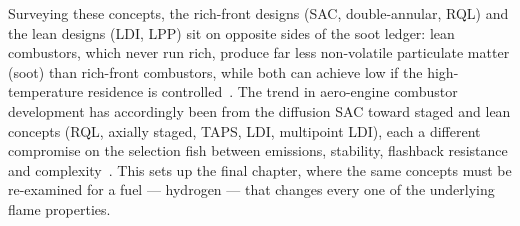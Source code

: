 Surveying these concepts, the rich-front designs (SAC, double-annular, RQL) and the lean designs (LDI, LPP) sit on opposite sides of the soot ledger: lean combustors, which never run rich, produce far less non-volatile particulate matter (soot) than rich-front combustors, while both can achieve low  if the high-temperature residence is controlled~\cite{lecture13,lecture12}. The trend in aero-engine combustor development has accordingly been from the diffusion SAC toward staged and lean concepts (RQL, axially staged, TAPS, LDI, multipoint LDI), each a different compromise on the selection fish between emissions, stability, flashback resistance and complexity~\cite{lecture13}. This sets up the final chapter, where the same concepts must be re-examined for a fuel --- hydrogen --- that changes every one of the underlying flame properties.
